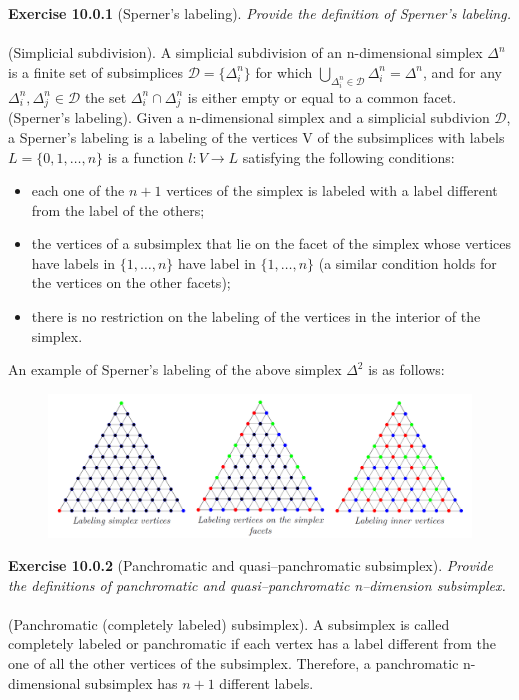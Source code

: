 \textbf{Exercise 10.0.1} (Sperner’s labeling). \textit{Provide the definition of Sperner’s labeling.}\\\\
(Simplicial subdivision). A simplicial subdivision of an n-dimensional simplex $\Delta^n$ is a finite set of subsimplices $\mathcal{D} = \{\Delta_i^n\}$ for which $\bigcup_{\Delta_i^n \in \mathcal{D}}{\Delta_i^n} = \Delta^n$, and for any $\Delta_i^n, \Delta_j^n \in \mathcal{D}$ the set $\Delta_i^n \cap \Delta_j^n$ is either empty or equal to a common facet.\\
(Sperner’s labeling). Given a n-dimensional simplex and a simplicial subdivion $ \mathcal{D} $, a Sperner’s labeling is a labeling of the vertices V of the subsimplices with labels $L = \{ 0, 1, \ldots, n \}$ is a function $l : V \rightarrow L$
satisfying the following conditions:
\begin{itemize}
\item each one of the $n+1$ vertices of the simplex is labeled with a label different from the label of the others;
\item the vertices of a subsimplex that lie on the facet of the simplex whose vertices have labels in $\{ 1, \ldots , n \}$ have label in $\{ 1, \ldots , n \}$ (a similar condition holds for the vertices on the other facets);
\item there is no restriction on the labeling of the vertices in the interior of the simplex.
\end{itemize}
An example of Sperner’s labeling of the above simplex $\Delta^2$ is as follows:
\begin{figure}[H]
\centering
\includegraphics[width=\textwidth]{images/img_2_10_01.png}
\end{figure}
\noindent
\textbf{Exercise 10.0.2} (Panchromatic and quasi–panchromatic subsimplex). \textit{Provide the definitions of panchromatic and quasi–panchromatic n–dimension subsimplex.}\\\\
(Panchromatic (completely labeled) subsimplex). A subsimplex is called completely labeled or panchromatic if each vertex has a label different from the one of all the other vertices of the subsimplex. Therefore, a panchromatic n-dimensional subsimplex has $n+1$ different labels.\\\\
